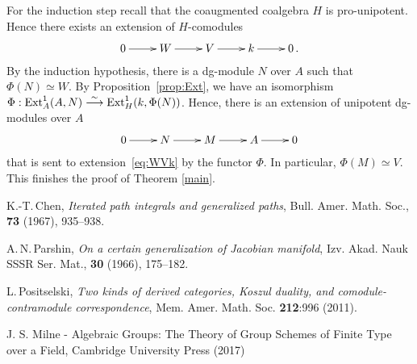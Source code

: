 \documentclass[10pt,russian]{article}
\theoremstyle{plain}
\theoremstyle{definition}
\newcommand{\Ext}{{\rm Ext}}
\begin{document}
For the induction step recall that the coaugmented coalgebra $H$ is pro-unipotent. Hence there exists an extension of \mbox{$H$-comodules}
\begin{equation}\label{eq:WVk}
\xymatrix{
	0 \ar[r] & W \ar[r] & V \ar[r] & k \ar[r] & 0\,.
}
\end{equation}
By the induction hypothesis, there is a dg-module $N$ over $A$ such that $\Phi(N)\simeq W$. By Proposition~\ref{prop:Ext}, we have an isomorphism $\Phi : \Ext^1_A(A,N) \stackrel{\sim}\longrightarrow \Ext^1_H (k,\Phi(N))$. Hence, there is an extension of unipotent dg-modules over $A$
$$
\xymatrix{
	0 \ar[r] & N \ar[r] & M \ar[r] & A \ar[r] & 0
}
$$
that is sent to extension~\eqref{eq:WVk} by the functor $\Phi$. In particular, $\Phi(M)\simeq V$. This finishes the proof of Theorem \ref{main}.
\begin{thebibliography}{99}
		
		
		K.-T.\,Chen, {\it Iterated path integrals and generalized paths}, Bull. Amer. Math. Soc., {\bf 73} (1967), 935--938.
		
		A.\,N.\,Parshin, {\it On a certain generalization of Jacobian manifold}, Izv. Akad. Nauk SSSR Ser. Mat., {\bf 30} (1966), 175--182.

L.\,Positselski, {\it Two kinds of derived categories, Koszul duality, and comodule-contramodule correspondence}, Mem. Amer. Math. Soc. {\bf 212}:996 (2011).

J. S. Milne - Algebraic Groups: The Theory of Group Schemes of Finite Type over a Field, Cambridge University Press (2017)
		
\end{thebibliography}
	
	
	
\end{document}
